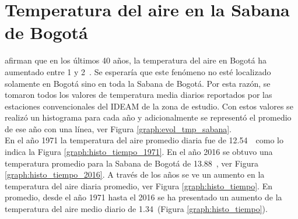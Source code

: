 



\section{Temperatura del aire en la Sabana de Bogotá} %
%
\citet{Ruiz2012} afirman que en los últimos 40 años, la temperatura del aire en Bogotá ha aumentado entre 1 y 2\celc \ . Se esperaría que este fenómeno no esté localizado solamente en Bogotá sino en toda la Sabana de Bogotá. Por esta razón, se tomaron todos los valores de temperatura media diarios reportados por las estaciones convencionales del IDEAM de la zona de estudio. Con estos valores se realizó un histograma para cada año y adicionalmente se representó el promedio de ese año con una línea, ver Figura \ref{graph:evol_tmp_sabana}.\\

En el año 1971 la temperatura del aire promedio diaria fue de 12.54\celc \  \ como lo indica la Figura \ref{graph:histo_tiempo_1971}. En el año 2016 se obtuvo una temperatura promedio para la Sabana de Bogotá de 13.88\celc \ , ver Figura \ref{graph:histo_tiempo_2016}. A través de los años se ve un aumento en la temperatura del aire diaria promedio, ver Figura \ref{graph:histo_tiempo}. En promedio, desde el año 1971 hasta el 2016 se ha presentado un aumento de la temperatura del aire medio diario de 1.34\celc \  (Figura \ref{graph:histo_tiempo}).\\



